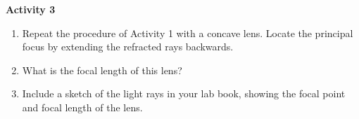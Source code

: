 

%
%
%
%
%
%
\textbf{Activity 3}

\begin{enumerate}[labparts]
\item Repeat the procedure of Activity 1 with a concave
lens. Locate the principal focus by extending the refracted rays backwards.

\item What is the focal length of this lens?\vspace{10mm}
\item Include a sketch of the light rays in your lab book, showing the focal 
point and focal length of the lens.
\end{enumerate}
